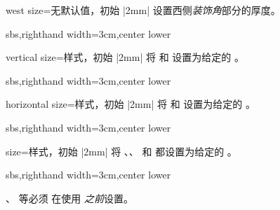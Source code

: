 \begin{vigTcbKey}[][doc new=2016-04-22]{west size}{=}{无默认值，初始 |2mm|}
  设置西侧\emph{装饰角}部分的厚度。
\begin{dispExample*}{sbs,righthand width=3cm,center lower}
\end{dispExample*}
\end{vigTcbKey}

\clearpage

\begin{vigTcbKey}[][doc new=2016-04-22]{vertical size}{=}{样式，初始 |2mm|}
  将  和 
  设置为给定的 。
\begin{dispExample*}{sbs,righthand width=3cm,center lower}
\end{dispExample*}
\end{vigTcbKey}

\begin{vigTcbKey}[][doc new=2016-04-22]{horizontal size}{=}{样式，初始 |2mm|}
  将  和 
  设置为给定的 。
\begin{dispExample*}{sbs,righthand width=3cm,center lower}
\end{dispExample*}
\end{vigTcbKey}


\begin{vigTcbKey}[][doc new=2016-04-22]{size}{=}{样式，初始 |2mm|}
  将 、、
   和 
  都设置为给定的 。
\begin{dispExample*}{sbs,righthand width=3cm,center lower}
\end{dispExample*}
\end{vigTcbKey}


\begin{marker}
、 等必须
在使用  \emph{之前}设置。
\end{marker}




